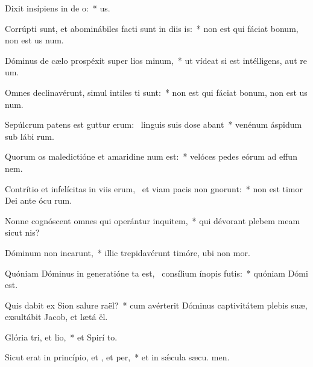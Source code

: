 \item Dixit insípiens in de o:~*   us.
\item Corrúpti sunt, et abominábiles facti sunt in diis is:~* non est qui fáciat bonum, non est us  num.
\item Dóminus de cælo prospéxit super lios minum,~* ut vídeat si est intélligens, aut re um.
\item Omnes declinavérunt, simul intiles ti sunt:~* non est qui fáciat bonum, non est us  num.
\item Sepúlcrum patens est guttur erum:~\pscross{} linguis suis dose abant~* venénum áspidum sub lábi rum.
\item Quorum os maledictióne et amaridine num est:~* velóces pedes eórum ad effun nem.
\item Contrítio et infelícitas in viis erum,~\pscross{} et viam pacis non gnorunt:~* non est timor Dei ante ócu rum.
\item Nonne cognóscent omnes qui operántur inquitem,~* qui dévorant plebem meam sicut  nis?
\item Dóminum non incarunt,~* illic trepidavérunt timóre, ubi non  mor.
\item Quóniam Dóminus in generatióne ta est,~\pscross{} consílium ínopis futis:~* quóniam Dómi   est.
\item Quis dabit ex Sion salure raël?~* cum avérterit Dóminus captivitátem plebis suæ, exsultábit Jacob, et lætá ël.
\item Glória tri, et lio,~* et Spirí to.
\item Sicut erat in princípio, et , et per,~* et in sǽcula sæcu. men.
